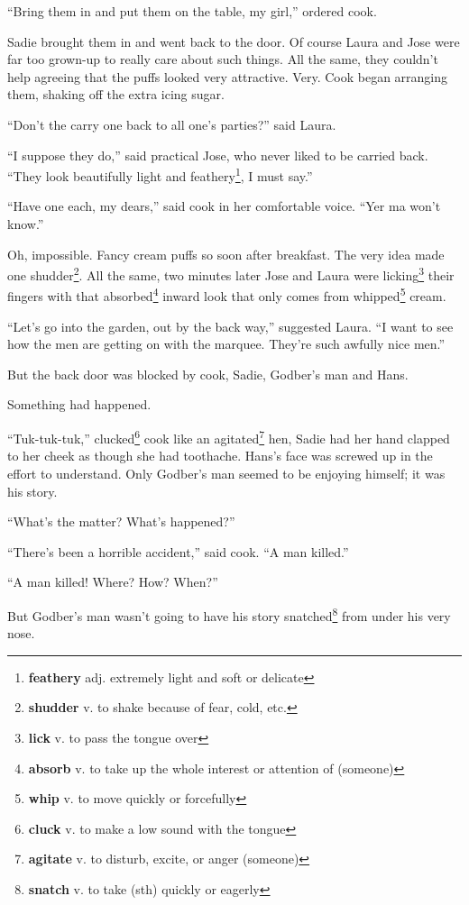 ``Bring them in and put them on the table, my girl,'' ordered cook.

Sadie brought them in and went back to the door. Of course Laura and Jose were far too grown-up to really care about such things. All the same, they couldn't help agreeing that the puffs looked very attractive. Very. Cook began arranging them, shaking off the extra icing sugar.

``Don't the carry one back to all one's parties?'' said Laura.

``I suppose they do,'' said practical Jose, who never liked to be carried back. ``They look beautifully light and feathery\footnote{\textbf{feathery} adj. extremely light and soft or delicate}, I must say.''

``Have one each, my dears,'' said cook in her comfortable voice. ``Yer ma won't know.''

Oh, impossible. Fancy cream puffs so soon after breakfast. The very idea made one shudder\footnote{\textbf{shudder} v. to shake because of fear, cold, etc.}. All the same, two minutes later Jose and Laura were licking\footnote{\textbf{lick} v. to pass the tongue over} their fingers with that absorbed\footnote{\textbf{absorb} v. to take up the whole interest or attention of (someone)} inward look that only comes from whipped\footnote{\textbf{whip} v. to move quickly or forcefully} cream.

``Let's go into the garden, out by the back way,'' suggested Laura. ``I want to see how the men are getting on with the marquee. They're such awfully nice men.''

But the back door was blocked by cook, Sadie, Godber's man and Hans.

Something had happened.

``Tuk-tuk-tuk,'' clucked\footnote{\textbf{cluck} v. to make a low sound with the tongue} cook like an agitated\footnote{\textbf{agitate} v. to disturb, excite, or anger (someone)} hen, Sadie had her hand clapped to her cheek as though she had toothache. Hans's face was screwed up in the effort to understand. Only Godber's man seemed to be enjoying himself; it was his story.

``What's the matter? What's happened?''

``There's been a horrible accident,'' said cook. ``A man killed.''

``A man killed! Where? How? When?''

But Godber's man wasn't going to have his story snatched\footnote{\textbf{snatch} v. to take (sth) quickly or eagerly} from under his very nose.

